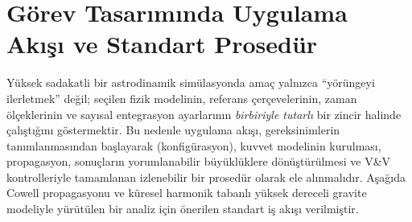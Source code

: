 \newpage
\section{Görev Tasarımında Uygulama Akışı ve Standart Prosedür}
\label{sec:workflow_procedure}

Yüksek sadakatli bir astrodinamik simülasyonda amaç yalnızca ``yörüngeyi ilerletmek'' değil; seçilen fizik modelinin,
referans çerçevelerinin, zaman ölçeklerinin ve sayısal entegrasyon ayarlarının \emph{birbiriyle tutarlı} bir zincir halinde
çalıştığını göstermektir. Bu nedenle uygulama akışı, gereksinimlerin tanımlanmasından başlayarak (konfigürasyon),
kuvvet modelinin kurulması, propagasyon, sonuçların yorumlanabilir büyüklüklere dönüştürülmesi ve V\&V kontrolleriyle
tamamlanan izlenebilir bir prosedür olarak ele alınmalıdır. Aşağıda Cowell propagasyonu ve küresel harmonik tabanlı
yüksek dereceli gravite modeliyle yürütülen bir analiz için önerilen standart iş akışı verilmiştir.

